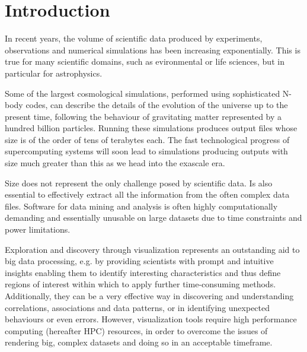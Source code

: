\documentclass[runningheads,a4paper]{llncs}
\begin{document}
\section{Introduction}
\label{sect:introduction}

In recent years, the volume of scientific data produced by experiments, observations and numerical simulations 
has been increasing exponentially. This is true for many scientific domains, such as evironmental or life sciences, 
but in particular for astrophysics. 


Some of the largest cosmological simulations, performed using sophisticated N-body codes, can describe the details 
of the evolution of the universe up to the present time, following the behaviour of gravitating matter represented 
by a hundred billion particles. Running these simulations produces output files whose size is of the order of tens 
of terabytes each. The fast technological progress of supercomputing systems will soon lead to simulations producing 
outputs with size much greater than this as we head into the exascale era.

Size does not represent the only challenge posed by scientific data. Is also essential to effectively extract 
all the information from the often complex data files. Software for data mining and analysis is often highly 
computationally demanding and essentially unusable on large datasets due to time constraints and power limitations.   

Exploration and discovery through visualization represents an outstanding aid to big data processing, e.g. by providing 
scientists with prompt and intuitive insights enabling them to identify interesting characteristics 
and thus define regions of interest within which to apply further time-consuming methods. Additionally, 
they can be a very effective way in discovering and understanding correlations, associations and data patterns, 
or in identifying unexpected behaviours or even errors. However, visualization tools require high performance computing 
(hereafter HPC) resources, in order to overcome the issues of rendering big, complex datasets and doing so in an 
acceptable timeframe.
\end{document}
